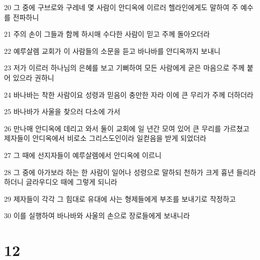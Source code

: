 \par 20 그 중에 구브로와 구레네 몇 사람이 안디옥에 이르러 헬라인에게도 말하여 주 예수를 전파하니
\par 21 주의 손이 그들과 함께 하시매 수다한 사람이 믿고 주께 돌아오더라
\par 22 예루살렘 교회가 이 사람들의 소문을 듣고 바나바를 안디옥까지 보내니
\par 23 저가 이르러 하나님의 은혜를 보고 기뻐하여 모든 사람에게 굳은 마음으로 주께 붙어 있으라 권하니
\par 24 바나바는 착한 사람이요 성령과 믿음이 충만한 자라 이에 큰 무리가 주께 더하더라
\par 25 바나바가 사울을 찾으러 다소에 가서
\par 26 만나매 안디옥에 데리고 와서 둘이 교회에 일 년간 모여 있어 큰 무리를 가르쳤고 제자들이 안디옥에서 비로소 그리스도인이라 일컫음을 받게 되었더라
\par 27 그 때에 선지자들이 예루살렘에서 안디옥에 이르니
\par 28 그 중에 아가보라 하는 한 사람이 일어나 성령으로 말하되 천하가 크게 흉년 들리라 하더니 글라우디오 때에 그렇게 되니라
\par 29 제자들이 각각 그 힘대로 유대에 사는 형제들에게 부조를 보내기로 작정하고
\par 30 이를 실행하여 바나바와 사울의 손으로 장로들에게 보내니라

\chapter{12}

